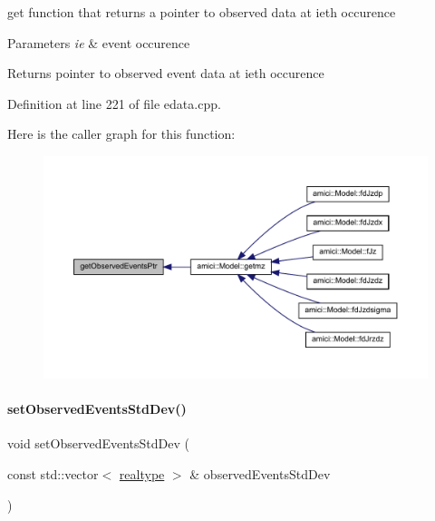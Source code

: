 get function that returns a pointer to observed data at ieth occurence


\begin{DoxyParams}{Parameters}
{\em ie} & event occurence \\
\hline
\end{DoxyParams}
\begin{DoxyReturn}{Returns}
pointer to observed event data at ieth occurence 
\end{DoxyReturn}


Definition at line 221 of file edata.\+cpp.

Here is the caller graph for this function\+:
\nopagebreak
\begin{figure}[H]
\begin{center}
\leavevmode
\includegraphics[width=350pt]{classamici_1_1_exp_data_a95ab3fe91af62612f202fdc6cd033d2a_icgraph}
\end{center}
\end{figure}
\mbox{\label{classamici_1_1_exp_data_af55c1775810031cd4b6e283f6dd220be}} 
\paragraph{\texorpdfstring{set\+Observed\+Events\+Std\+Dev()}{setObservedEventsStdDev()}\hspace{0.1cm}{\footnotesize\ttfamily [1/4]}}
{\footnotesize\ttfamily void set\+Observed\+Events\+Std\+Dev (\begin{DoxyParamCaption}\item[{const std\+::vector$<$ \mbox{\hyperlink{namespaceamici_a1bdce28051d6a53868f7ccbf5f2c14a3}{realtype}} $>$ \&}]{observed\+Events\+Std\+Dev }\end{DoxyParamCaption})}

